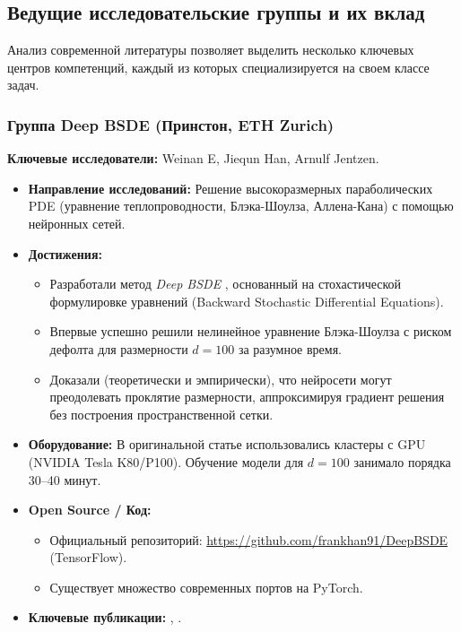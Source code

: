\documentclass[12pt, a4paper]{article}
\begin{document}
\subsection{Ведущие исследовательские группы и их вклад}

Анализ современной литературы позволяет выделить несколько ключевых центров компетенций, каждый из которых специализируется на своем классе задач.

\subsubsection{Группа Deep BSDE (Принстон, ETH Zurich)}
\textbf{Ключевые исследователи:} Weinan E, Jiequn Han, Arnulf Jentzen.

\begin{itemize}
    \item \textbf{Направление исследований:} Решение высокоразмерных параболических PDE (уравнение теплопроводности, Блэка-Шоулза, Аллена-Кана) с помощью нейронных сетей.
    \item \textbf{Достижения:}
    \begin{itemize}
        \item Разработали метод \textit{Deep BSDE} \cite{Han2018}, основанный на стохастической формулировке уравнений (Backward Stochastic Differential Equations).
        \item Впервые успешно решили нелинейное уравнение Блэка-Шоулза с риском дефолта для размерности $d=100$ за разумное время.
        \item Доказали (теоретически и эмпирически), что нейросети могут преодолевать проклятие размерности, аппроксимируя градиент решения без построения пространственной сетки.
    \end{itemize}
    \item \textbf{Оборудование:} В оригинальной статье использовались кластеры с GPU (NVIDIA Tesla K80/P100). Обучение модели для $d=100$ занимало порядка 30--40 минут.
    \item \textbf{Open Source / Код:}
    \begin{itemize}
        \item Официальный репозиторий: \url{https://github.com/frankhan91/DeepBSDE} (TensorFlow).
        \item Существует множество современных портов на PyTorch.
    \end{itemize}
    \item \textbf{Ключевые публикации:} \cite{Han2018}, \cite{Beck2019}.
\end{itemize}
\end{document}
